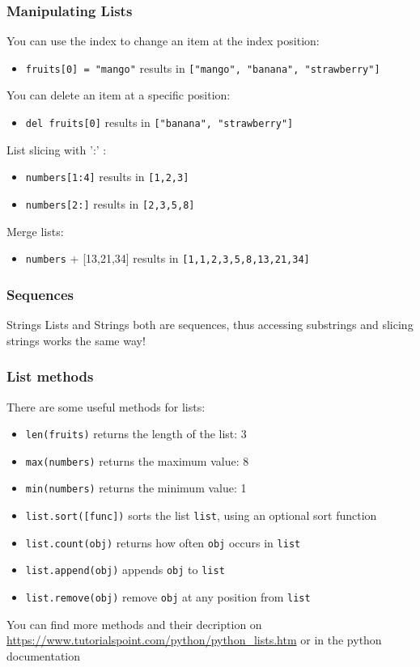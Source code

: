 \documentclass{beamer}
\begin{document}
\begin{frame}
\frametitle{Manipulating Lists}
	You can use the index to change an item at the index position:
	\begin{itemize}
	\item \texttt{fruits[0] = "mango"} results in \texttt{["mango", "banana", "strawberry"]}
	\end{itemize}
	You can delete an item at a specific position:
	\begin{itemize}
	\item \texttt{del fruits[0]} results in \texttt{["banana", "strawberry"]}
	\end{itemize}
	List slicing with ':' :
	\begin{itemize}
	\item \texttt{numbers[1:4]} results in \texttt{[1,2,3]}
	\item \texttt{numbers[2:]} results in \texttt{[2,3,5,8]}
	\end{itemize}
	Merge lists:
	\begin{itemize}
	\item \texttt{numbers} + [13,21,34] results in \texttt{[1,1,2,3,5,8,13,21,34]}
	\end{itemize}
\end{frame}

\begin{frame}
\frametitle{Sequences}
	\begin{alertblock}{Strings}
		Lists and Strings both are sequences, thus accessing substrings and slicing strings works the same way!
	\end{alertblock}
\end{frame}

\begin{frame}
\frametitle{List methods}
	There are some useful methods for lists:
	\begin{itemize}
	\item \texttt{len(fruits)} returns the length of the list: 3
	\item \texttt{max(numbers)} returns the maximum value: 8
	\item \texttt{min(numbers)} returns the minimum value: 1
	\item \texttt{list.sort([func])} sorts the list \texttt{list}, using an optional sort function
	\item \texttt{list.count(obj)} returns how often \texttt{obj} occurs in \texttt{list}
	\item \texttt{list.append(obj)} appends \texttt{obj} to \texttt{list}
	\item \texttt{list.remove(obj)} remove \texttt{obj} at any position from \texttt{list}
	\end{itemize}
	You can find more methods and their decription on \url{https://www.tutorialspoint.com/python/python_lists.htm} or in the python documentation
\end{frame}
\end{document}
